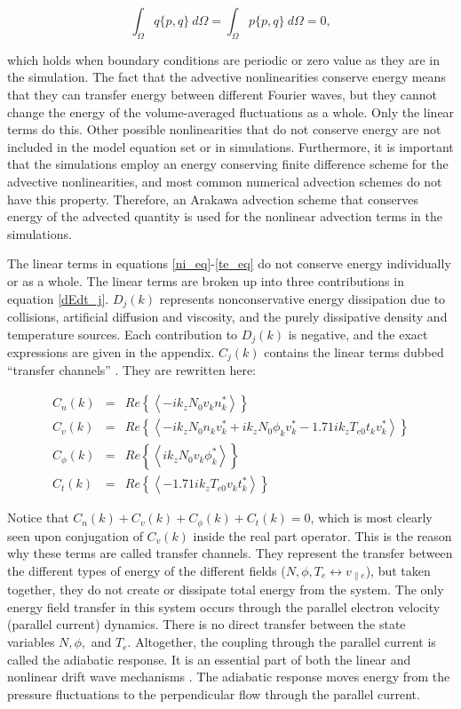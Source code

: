 \documentclass[showpacs,preprintnumbers,amsmath,amssymb,superscriptaddress]{revtex4}
\def\beq{\begin{equation}}
\def\eeq{\end{equation}}
\def\beqar{\begin{eqnarray}}
\def\eeqar{\end{eqnarray}}
\def\para{\parallel}
\begin{document}
\beq
\label{poisson_rln}
\int_\Omega q \{p,q\} \ d\Omega = \int_\Omega p \{p,q\} \ d\Omega = 0,
\eeq

which holds when boundary conditions are periodic or zero value as they are in the simulation. 
The fact that the advective nonlinearities conserve energy means that they can transfer energy between different Fourier waves,
but they cannot change the energy of the volume-averaged fluctuations as a whole. Only the linear terms do this.
Other possible nonlinearities that do not conserve energy are not included in the model equation set or in simulations. 
Furthermore, it is important that the simulations employ an energy conserving finite difference
scheme for the advective nonlinearities, and most common numerical advection schemes do not have this property. Therefore, an Arakawa advection scheme \cite{arakawa1966} that conserves 
energy of the advected quantity is used for the nonlinear advection terms in the simulations.

The linear terms in equations \ref{ni_eq}-\ref{te_eq} do not conserve energy individually or as a whole. The linear terms are broken up into three contributions in equation \ref{dEdt_j}.
$D_{j}(k)$ represents nonconservative energy dissipation due to collisions, artificial diffusion and viscosity, and the purely dissipative density and temperature sources.
Each contribution to $D_j(k)$ is negative, and the exact expressions are given in the appendix. 
$C_j(k)$ contains the linear terms dubbed ``transfer channels'' \cite{scott2002}. They are rewritten here:

\beqar
C_n(k) & = & Re \left\{ \left< - i k_z N_0 v_k n_k^* \right> \right\}
\label{Cnk} \\
C_v(k) & = & Re \left\{ \left< - i k_z N_0 n_k v_k^* + i k_z N_0 \phi_k v_k^*  - 1.71 i k_z T_{e0} t_k v_k^*  \right> \right\}
\label{Cvk} \\
C_\phi(k) & = & Re \left\{ \left< i k_z N_0 v_k \phi_k^* \right> \right\}
\label{Cpk} \\
C_t(k) & = & Re \left\{ \left< - 1.71 i k_z T_{e0} v_k t_k^* \right> \right\}
\label{Ctk}
\eeqar

Notice that $C_n(k) + C_v(k) + C_\phi(k) + C_t(k) = 0$, which is most clearly seen upon conjugation of $C_v(k)$ inside the real part operator.
This is the reason why these terms are called transfer channels. They represent the transfer
between the different types of energy of the different fields ($N,\phi,T_e \leftrightarrow v_{\para e}$), but taken together, they do not create or dissipate total
energy from the system. The only energy field transfer in this system occurs through the parallel electron velocity (parallel current) dynamics. There is no direct transfer between
the state variables $N, \phi,$ and $T_e$.  Altogether, the coupling through the parallel current is called the
adiabatic response. It is an essential part of both the linear and nonlinear
drift wave mechanisms \cite{scott2002,scott2005}. The adiabatic response moves energy from the pressure fluctuations to the perpendicular flow through the parallel current. \\
\end{document}
